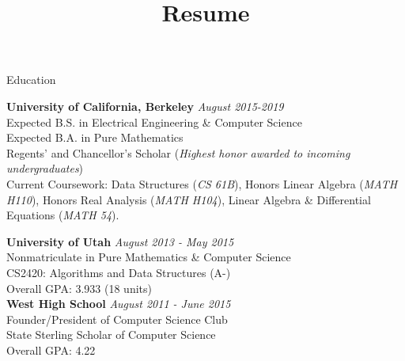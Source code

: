 \documentclass{resume} %
\title{Resume}
\begin{document}

\begin{rSection}{Education}

{\bf University of California, Berkeley} \hfill {\em August 2015-2019} \\ 
Expected B.S. in  Electrical Engineering \& Computer Science\\
Expected B.A. in Pure Mathematics \\
Regents' and Chancellor's Scholar (\textit{Highest honor awarded to incoming undergraduates}) \\
Current Coursework: Data Structures (\textit{CS 61B}), Honors Linear Algebra (\textit{MATH H110}), {Honors} Real Analysis (\textit{MATH H104}), Linear Algebra \& Differential Equations (\textit{MATH 54}). 

{\bf University of Utah} \hfill {\em August 2013 - May 2015} \\ 
Nonmatriculate in Pure Mathematics \& Computer Science \\
CS2420: Algorithms and Data Structures (A-) \\
Overall GPA: 3.933 (18 units) \\

{\bf West High School} \hfill {\em August 2011 - June 2015} \\ 
Founder/President of Computer Science Club \\
State Sterling Scholar of Computer Science \\ 
Overall GPA: 4.22 
\end{rSection}

\end{document}
